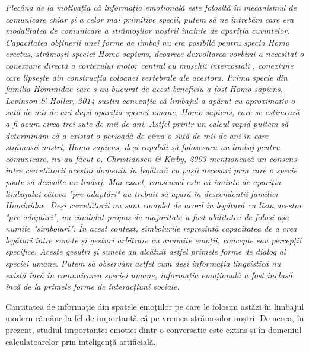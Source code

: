 \documentclass[a4paper,12pt]{book}
\begin{document}
			\textit{	Plecând de la motivația că informația emoțională  este folosită în mecanismul de comunicare chiar și a celor mai primitive specii, putem să ne întrebăm care era modalitatea de comunicare a strămoșilor noștrii înainte de apariția cuvintelor. Capacitatea obținerii unei forme de limbaj nu era posibilă pentru specia \textit{Homo erectus}, strămoșii speciei \textit{Homo sapiens}, deoarece dezvoltarea vorbirii a necesitat o conexiune directă a cortexului motor central cu mușchii intercostali , conexiune care lipsește din construcția coloanei vertebrale ale acestora. Prima specie din familia \textit{Hominidae} care s-au bucurat de acest beneficiu a fost \textit{Homo sapiens}.  Levinson \& Holler, 2014 \cite{leviholler} susțin convenția că limbajul a apărut cu aproximativ o sută de mii de ani după apariția speciei umane, \textit{Homo sapiens}, care se estimează a fi acum circa trei sute de mii de ani. Astfel printr-un calcul rapid puitem să determinăm că a existat o perioadă de circa o sută de mii de ani în care strămoșii noștri, \textit{Homo sapiens}, deși capabili să folosesaca un limbaj pentru comunicare, nu au făcut-o. Christiansen \& Kirby, 2003 \cite{chriskirbi} menționează un consens între cercetătorii acestui domeniu în legătură cu pașii necesari prin care o specie poate să dezvolte un limbaj. Mai exact, consensul este că înainte de apariția limbajului câteva "pre-adaptări" au trebuit să apară în descendenții familiei \textit{Hominidae}. Deși cercetătorii nu sunt complet de acord în legătură cu lista acestor "pre-adaptări", un candidat propus de majoritate a fost abilitatea de folosi așa numite "simboluri". În acest context, simbolurile reprezintă capacitatea de a crea legături între sunete și gesturi arbitrare cu anumite emoții, concepte sau percepții specifice. Aceste gesutri și sunete au alcătuit astfel primele forme de dialog al speciei umane. Putem să observăm astfel cum deși informația lingvistică nu există încă în comunicarea speciei umane, informația emoțională a fost inclusă încă de la primele forme de interacțiuni sociale.}\par 				
				Cantitatea de informație din spatele emoțiilor pe care le folosim astăzi în limbajul modern rămâne la fel de importantă că pe vremea strămoșilor noștri. De aceea, în prezent, studiul importanței emoției dintr-o conversație este extins și în domeniul calculatoarelor prin inteligență artificială. \par 	
				
\end{document}
